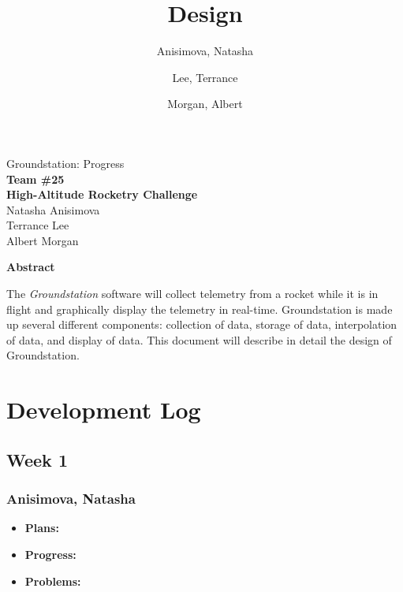 \documentclass[10pt,draftclsnofoot,onecolumn]{IEEEtran}
\begin{document}
	\singlespace
	
	\title{\vspace{2in}Design}
	
	\author {
		Anisimova, Natasha
		\and
		Lee, Terrance
		\and
		Morgan, Albert
	}
	
	
	\pagestyle{empty}
	\vspace*{2in}
	\begin{center}
		\huge
		Groundstation: Progress\\
		\normalsize
		\vspace{5mm}
		\textbf{
			Team \#25\\
			High-Altitude Rocketry Challenge\\
		}
		\vspace{1mm}
		Natasha Anisimova\\
		Terrance Lee\\
		Albert Morgan
	\end{center}
	
	\vspace{5mm}
	
	\begin{center}
		\textbf{Abstract}
	\end{center}
	
	
	The \textit{Groundstation} software will collect telemetry from a rocket while it is in flight and graphically display the telemetry in real-time. Groundstation is made up several different components: collection of data, storage of data, interpolation of data, and 
	display of data.
	This document will describe in detail the design of Groundstation.
		
	\pagestyle{headings}
	
	\newpage

	\tableofcontents
	\newpage

\section{Development Log}

\subsection{Week 1}
\subsubsection{Anisimova, Natasha}
\begin{itemize}
	\item \textbf{Plans:}
	\item \textbf{Progress:}
	\item \textbf{Problems:}
\end{itemize}
\end{document}
